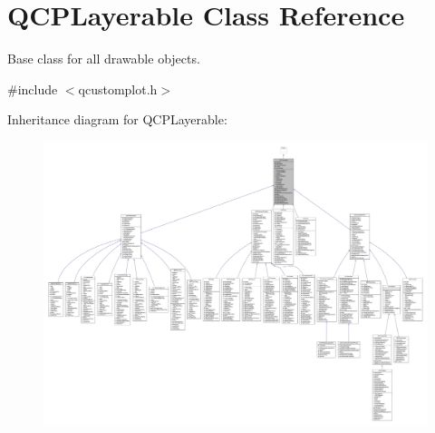 \hypertarget{class_q_c_p_layerable}{}\section{Q\+C\+P\+Layerable Class Reference}
\label{class_q_c_p_layerable}


Base class for all drawable objects.  




{\ttfamily \#include $<$qcustomplot.\+h$>$}



Inheritance diagram for Q\+C\+P\+Layerable\+:\nopagebreak
\begin{figure}[H]
\begin{center}
\leavevmode
\includegraphics[width=350pt]{class_q_c_p_layerable__inherit__graph}
\end{center}
\end{figure}


